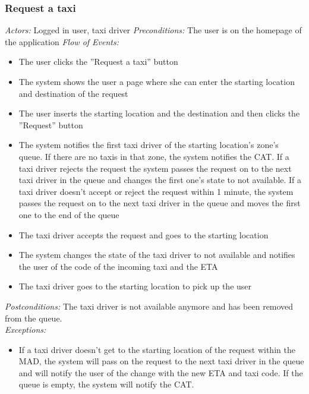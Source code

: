 \documentclass{article}
\begin{document}
\subsubsection{Request a taxi}
\textit{Actors:} Logged in user, taxi driver
\textit{Preconditions:} The user is on the homepage of the application
\textit{Flow of Events:}
	\begin{itemize}
		\item  The user clicks the ''Request a taxi'' button
		\item  The system shows the user a page where she can enter the starting location and destination of the request
		\item  The user inserts the starting location and the destination and then clicks the ''Request'' button
		\item  The system notifies the first taxi driver of the starting location's zone's queue. If there are no taxis in that zone, the system notifies the CAT\@. If a taxi driver rejects the request the system passes the request on to the next taxi driver in the queue and changes the first one's state to not available. If a taxi driver doesn't accept or reject the request within 1 minute, the system passes the request on to the next taxi driver in the queue and moves the first one to the end of the queue
		\item  The taxi driver accepts the request and goes to the starting location
		\item  The system changes the state of the taxi driver to not available and notifies the user of the code of the incoming taxi and the ETA 
		\item The taxi driver goes to the starting location to pick up the user
	\end{itemize}
\textit{Postconditions:} The taxi driver is not available anymore and has been removed from the queue.
\\\textit{Exceptions:}
	\begin{itemize}
		\item If a taxi driver doesn't get to the starting location of the request within the MAD, the system will pass on the request to the next taxi driver in the queue and will notify the user of the change with the new ETA and taxi code. If the queue is empty, the system will notify the CAT.
	\end{itemize}
	
\end{document}

